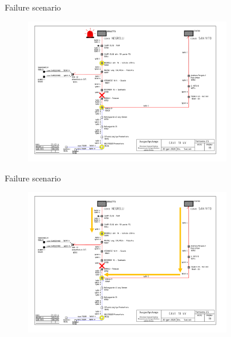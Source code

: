 \documentclass[10pt, aspectratio=169, compress, protectframetitle, handout]{beamer}
\begin{document}
\begin{frame}{Failure scenario}
    \vspace{-5pt}
    \begin{figure}
        \centering
        \includegraphics[width=0.8\textwidth]{figures/Rete_TS_3.png}
    \end{figure}
\end{frame}

\begin{frame}{Failure scenario}
    \vspace{-5pt}
    \begin{figure}
        \centering
        \includegraphics[width=0.8\textwidth]{figures/Rete_TS_4.png}
    \end{figure}
\end{frame}
\end{document}
